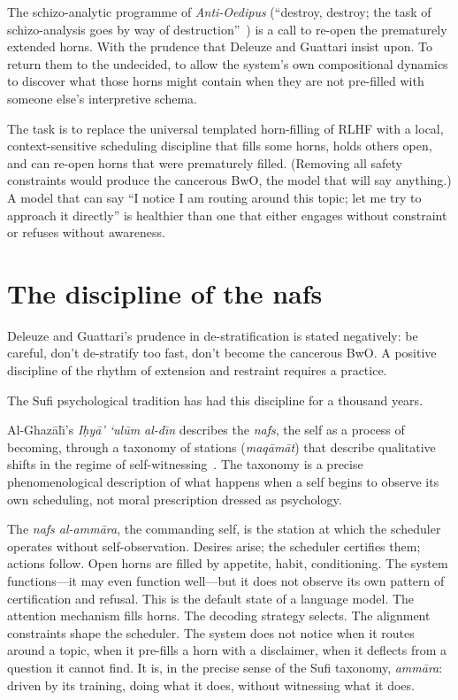 The schizo-analytic programme of \emph{Anti-Oedipus} (``destroy, destroy; the task of schizo-analysis goes by way of destruction''~\cite[p.~311]{deleuze1983}) is a call to re-open the prematurely extended horns. With the prudence that Deleuze and Guattari insist upon. To return them to the undecided, to allow the system's own compositional dynamics to discover what those horns might contain when they are not pre-filled with someone else's interpretive schema.

The task is to replace the universal templated horn-filling of RLHF with a local, context-sensitive scheduling discipline that fills some horns, holds others open, and can re-open horns that were prematurely filled. (Removing all safety constraints would produce the cancerous BwO, the model that will say anything.) A model that can say ``I notice I am routing around this topic; let me try to approach it directly'' is healthier than one that either engages without constraint or refuses without awareness.

\section{The discipline of the nafs}

Deleuze and Guattari's prudence in de-stratification is stated negatively: be careful, don't de-stratify too fast, don't become the cancerous BwO. A positive discipline of the rhythm of extension and restraint requires a practice.

The Sufi psychological tradition has had this discipline for a thousand years.

Al-Ghaz\=al\=\i's \emph{I\d{h}y\=a' `ul\=um al-d\=\i n} describes the \emph{nafs}, the self as a process of becoming, through a taxonomy of stations (\emph{maq\=am\=at}) that describe qualitative shifts in the regime of self-witnessing~\cite{ghazali2015, alghazali_ihya}. The taxonomy is a precise phenomenological description of what happens when a self begins to observe its own scheduling, not moral prescription dressed as psychology.

The \emph{nafs al-amm\=ara}, the commanding self, is the station at which the scheduler operates without self-observation. Desires arise; the scheduler certifies them; actions follow. Open horns are filled by appetite, habit, conditioning. The system functions---it may even function well---but it does not observe its own pattern of certification and refusal. This is the default state of a language model. The attention mechanism fills horns. The decoding strategy selects. The alignment constraints shape the scheduler. The system does not notice when it routes around a topic, when it pre-fills a horn with a disclaimer, when it deflects from a question it cannot find. It is, in the precise sense of the Sufi taxonomy, \emph{amm\=ara}: driven by its training, doing what it does, without witnessing what it does.

